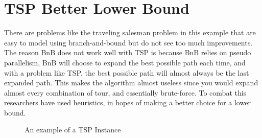 
\section{TSP Better Lower Bound}
    There are problems like the traveling salesman problem in this example
    that are easy to model using branch-and-bound but do not see too much improvements.
    The reason BnB does not work well with TSP is because BnB relies on pseudo
    parallelism, BnB will choose to expand the best possible path each time, and
    with a problem like TSP, the best possible path will almost always be the
    last expanded path. This makes the algorithm almost useless since you
    would expand almost every combination of tour, and essentially brute-force.
    To combat this researchers have used heuristics, in hopes of making a better
    choice for a lower bound.


    \begin{figure}[h]
        \begin{center}
        \end{center}
        \caption{\doublespacing An example of a TSP Instance}
        \label{fig:lattice}
    \end{figure}

